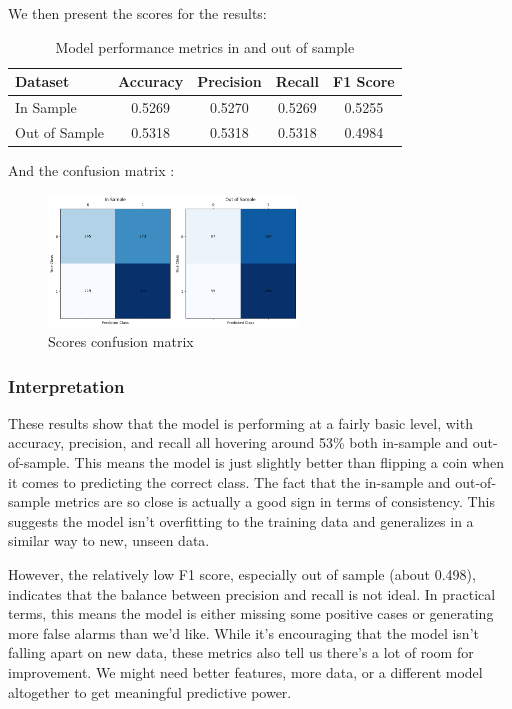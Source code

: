 \documentclass[
  a4paper]{article}
\begin{document}
We then present the scores for the results:

\begin{table}[h]
\centering
\begin{tabular}{|l|c|c|c|c|}
\hline
\textbf{Dataset} & \textbf{Accuracy} & \textbf{Precision} & \textbf{Recall} & \textbf{F1 Score} \\
\hline
In Sample      & 0.5269 & 0.5270 & 0.5269 & 0.5255 \\
Out of Sample  & 0.5318 & 0.5318 & 0.5318 & 0.4984 \\
\hline
\end{tabular}
\caption{Model performance metrics in and out of sample}

\end{table}

And the confusion matrix :

\begin{figure}

{\centering \includegraphics[width=2.60417in,height=\textheight]{graphs/scores_cm.png}

}

\caption{Scores confusion matrix}

\end{figure}

\hypertarget{interpretation}{%
\subsubsection{Interpretation}\label{interpretation}}

These results show that the model is performing at a fairly basic level,
with accuracy, precision, and recall all hovering around 53\% both
in-sample and out-of-sample. This means the model is just slightly
better than flipping a coin when it comes to predicting the correct
class. The fact that the in-sample and out-of-sample metrics are so
close is actually a good sign in terms of consistency. This suggests the
model isn't overfitting to the training data and generalizes in a
similar way to new, unseen data.

However, the relatively low F1 score, especially out of sample (about
0.498), indicates that the balance between precision and recall is not
ideal. In practical terms, this means the model is either missing some
positive cases or generating more false alarms than we'd like. While
it's encouraging that the model isn't falling apart on new data, these
metrics also tell us there's a lot of room for improvement. We might
need better features, more data, or a different model altogether to get
meaningful predictive power.
\end{document}
